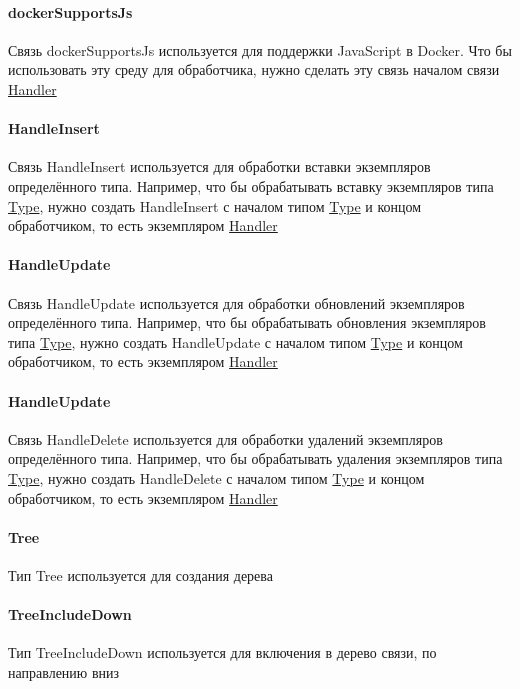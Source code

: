 \documentclass{article}
\begin{document}
\paragraph*{dockerSupportsJs}\hypertarget{Core.dockerSupportsJs.Description}{}
Связь dockerSupportsJs используется для
поддержки JavaScript в Docker. Что бы использовать эту среду для обработчика,
нужно сделать эту связь началом связи \hyperlink{Core.Handler.Description}{Handler}
\paragraph*{HandleInsert}\hypertarget{Core.HandleInsert.Description}{}
Связь HandleInsert используется для обработки
вставки экземпляров определённого типа. Например, что бы обрабатывать вставку
экземпляров типа \hyperlink{Core.Type.Description}{Type}, нужно создать HandleInsert с
началом типом \hyperlink{Core.Type.Description}{Type} и концом обработчиком, то есть
экземпляром \hyperlink{Core.Handler.Description}{Handler}
\paragraph*{HandleUpdate}\hypertarget{Core.HandleUpdate.Description}{}
Связь HandleUpdate используется для обработки
обновлений экземпляров определённого типа. Например, что бы обрабатывать
обновления экземпляров типа \hyperlink{Core.Type.Description}{Type}, нужно создать
HandleUpdate с началом типом \hyperlink{Core.Type.Description}{Type} и концом обработчиком,
то есть экземпляром \hyperlink{Core.Handler.Description}{Handler}
\paragraph*{HandleUpdate}\hypertarget{Core.HandleDelete.Description}{}
Связь HandleDelete используется для обработки
удалений экземпляров определённого типа. Например, что бы обрабатывать удаления
экземпляров типа \hyperlink{Core.Type.Description}{Type}, нужно создать HandleDelete с
началом типом \hyperlink{Core.Type.Description}{Type} и концом обработчиком, то есть
экземпляром \hyperlink{Core.Handler.Description}{Handler}
\paragraph*{Tree}\hypertarget{Core.Tree.Description}{}
Тип Tree используется для создания дерева
\paragraph*{TreeIncludeDown}\hypertarget{Core.TreeIncludeDown.Description}{}
Тип TreeIncludeDown используется для
включения в дерево связи, по направлению вниз
\end{document}
